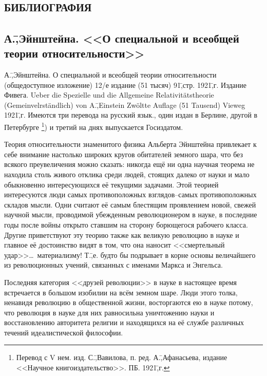 \section*{\textsc{библиография}}
\label{sec:10}

\subsection*{А.\=,Эйнштейна. <<О специальной и всеобщей теории относительности>>}
\label{subsec:10.1}

А.\=,Эйнштейна. О специальной и всеобщей теории относительности (общедоступное изложение) 12\-/е издание (51 тысяч) 91\=,стр. 1921\=,г. Издание Фивега. Ueber die Spezielle und die Allgemeine Relativit\"{a}tstheorie (Gemeinvelrst\"{a}ndlich) von A.\=,Einstein Zw\"{o}ltte Auflage (51 Tausend) Vieweg 1921\=,г. Имеются три перевода на русский язык., один издан в Берлине, другой в Петербурге \footnote{Перевод с V нем. изд. С.\=,Вавилова, п. ред. А.\=,Афанасьева, издание <<Научное книгоиздательство>>. ПБ. 1921\=,г.}) и третий на днях выпускается Госиздатом.

Теория относительности знаменитого физика Альберта Эйнштейна привлекает к себе внимание настолько широких кругов обитателей земного шара, что без всякого преувеличения можно сказать: никогда ещё ни одна научная теорема не находила столь живого отклика среди людей, стоящих далеко от науки и мало обыкновенно интересующихся её текущими задачами. Этой теорией интересуются люди самых противоположных взглядов\---самых противоположных складов мысли. Одни считают её самым блестящим проявлением новой, свежей научной мысли, проводимой убежденным революционером в науке, в последние годы после войны открыто ставшим на сторону борющегося рабочего класса. Другие приветствуют эту теорию также как великую революцию в науке и главное её достоинство видят в том, что она наносит <<смертельный удар>>\dots\ материализму! Т.\=,е. будто бы подрывает в корне основы величайшего из революционных учений, связанных с именами Маркса и Энгельса.

Последняя категория <<друзей революции>> в науке в настоящее время встречается в большом изобилии на всём земном шаре. Люди этого толка, ненавидя революцию в общественной жизни, восторгаются ею в науке потому, что революция в науке для них равносильна уничтожению науки и восстановлению авторитета религии и находящихся на её службе различных течений идеалистической философии.

